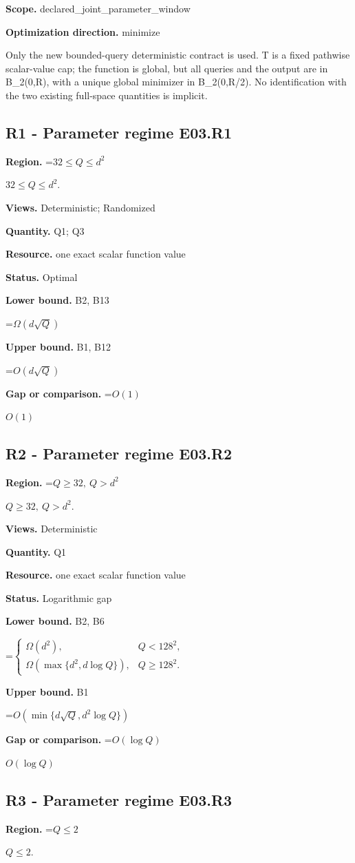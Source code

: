 \documentclass[10pt,a4paper]{article}
\newcommand{\AtlasMath}[1]{\par\begingroup\centering\setbox0=\hbox{$\displaystyle #1$}\ifdim\wd0>1.4\linewidth\typeout{ATLAS WIDE FORMULA: \the\wd0}\fi\ifdim\wd0>\linewidth\resizebox{\linewidth}{!}{\box0}\else\box0\fi\par\endgroup}
\newcommand{\AtlasInlineMath}[1]{\begingroup\setbox0=\hbox{$#1$}\ifdim\wd0>.4\linewidth\endgroup\AtlasMath{#1}\else\endgroup$#1$\fi}
\begin{document}
\textbf{Scope.} declared\_joint\_parameter\_window

\textbf{Optimization direction.} minimize

Only the new bounded-query deterministic contract is used. T is a fixed pathwise scalar-value cap; the function is global, but all queries and the output are in B\_2(0,R), with a unique global minimizer in B\_2(0,R/2). No identification with the two existing full-space quantities is implicit.

\subsection{R1 - Parameter regime E03.R1}
\textbf{Region.} \AtlasInlineMath{32\le Q\le d^2}.

\textbf{Views.} Deterministic; Randomized

\textbf{Quantity.} Q1; Q3

\textbf{Resource.} one exact scalar function value

\textbf{Status.} Optimal

\textbf{Lower bound.} B2, B13

\AtlasMath{\Omega(d\sqrt Q)}
\textbf{Upper bound.} B1, B12

\AtlasMath{O(d\sqrt Q)}
\textbf{Gap or comparison.} \AtlasInlineMath{O(1)}

\subsection{R2 - Parameter regime E03.R2}
\textbf{Region.} \AtlasInlineMath{Q\ge32,\ Q>d^2}.

\textbf{Views.} Deterministic

\textbf{Quantity.} Q1

\textbf{Resource.} one exact scalar function value

\textbf{Status.} Logarithmic gap

\textbf{Lower bound.} B2, B6

\AtlasMath{\begin{cases}\Omega(d^2),&Q<128^2,\\\Omega(\max\{d^2,d\log Q\}),&Q\ge128^2.\end{cases}}
\textbf{Upper bound.} B1

\AtlasMath{O(\min\{d\sqrt Q,d^2\log Q\})}
\textbf{Gap or comparison.} \AtlasInlineMath{O(\log Q)}

\subsection{R3 - Parameter regime E03.R3}
\textbf{Region.} \AtlasInlineMath{Q\le2}.
\end{document}
